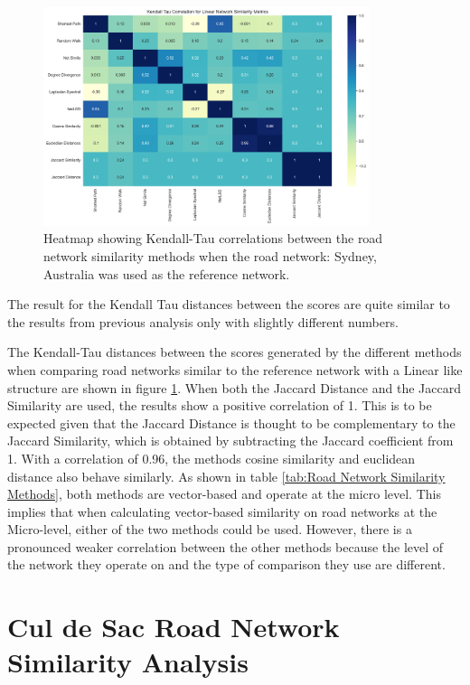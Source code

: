 \begin{figure}[!ht]
\centering
\includegraphics[width=0.85\textwidth,center]{picture/Linear/linear2.png}
\caption[Heatmap showing Kendall-Tau correlations between the road network similarity methods for Linear Road Networks]{Heatmap showing Kendall-Tau correlations between the road network similarity methods when the road network: Sydney, Australia was used as the reference network.}
\label{fig:network ranking linear}
\end{figure}

The result for the Kendall Tau distances between the scores are quite similar to the results from previous analysis only with slightly different numbers. 

The Kendall-Tau distances between the scores generated by the different methods when comparing road networks similar to the reference network with a Linear like structure are shown in figure \ref{fig:network ranking linear}. When both the Jaccard Distance and the Jaccard Similarity are used, the results show a positive correlation of 1. This is to be expected given that the Jaccard Distance is thought to be complementary to the Jaccard Similarity, which is obtained by subtracting the Jaccard coefficient from 1. With a correlation of 0.96, the methods cosine similarity and euclidean distance also behave similarly. As shown in table \ref{tab:Road Network Similarity Methods}, both methods are vector-based and operate at the micro level. This implies that when calculating vector-based similarity on road networks at the Micro-level, either of the two methods could be used. However, there is a pronounced weaker correlation between the other methods because the level of the network they operate on and the type of comparison they use are different.


\section{Cul de Sac Road Network Similarity Analysis}

